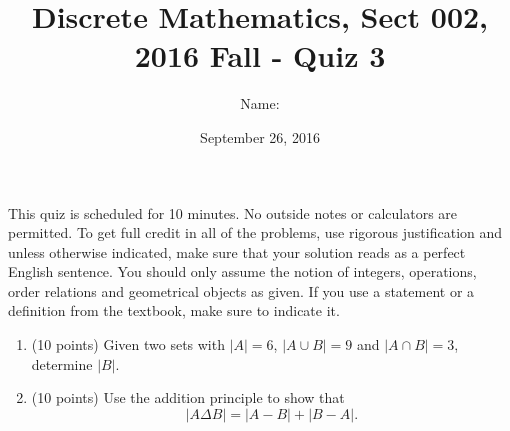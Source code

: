 \documentclass[11pt]{preprint}
\title{Discrete Mathematics, Sect 002, 2016 Fall - Quiz 3}
\author{Name:}
\institute{Courant Institute of Mathematical Sciences, NYU}
\date{September 26, 2016}
\begin{document}
\maketitle

This quiz is scheduled for 10 minutes. No outside notes or calculators are permitted. To get full credit  in all of the problems, use rigorous justification and unless otherwise indicated, make sure that your solution reads as a perfect English sentence. You should only assume the notion of integers, operations, order relations and geometrical objects as given. If you use a statement or a definition from the textbook, make sure to indicate it.
\vspace{0.2cm}

\begin{enumerate}
\item (10 points) Given two sets with $|A|=6$, $|A\cup B|=9$ and $|A\cap B|=3$, determine $|B|$.

\vspace{4cm}




\item (10 points) Use the addition principle to show that
\[
|A\Delta B|=|A-B|+|B-A|.
\]


\end{enumerate}
\end{document}
